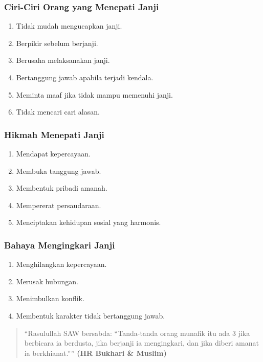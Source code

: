 \subsubsection{Ciri-Ciri Orang yang Menepati Janji}
\begin{enumerate}
\item Tidak mudah mengucapkan janji.
\item Berpikir sebelum berjanji.
\item Berusaha melaksanakan janji.
\item Bertanggung jawab apabila terjadi kendala.
\item Meminta maaf jika tidak mampu memenuhi janji.
\item Tidak mencari cari alasan.
\end{enumerate}

\subsubsection{Hikmah Menepati Janji}
\begin{enumerate}
\item Mendapat kepercayaan.
\item Membuka tanggung jawab.
\item Membentuk pribadi amanah.
\item Mempererat persaudaraan.
\item Menciptakan kehidupan sosial yang harmonis.
\end{enumerate}

\subsubsection{Bahaya Mengingkari Janji}
\begin{enumerate}
\item Menghilangkan kepercayaan.
\item Merusak hubungan.
\item Menimbulkan konflik.
\item Membentuk karakter tidak bertanggung jawab.
\end{enumerate}

\begin{quotation}
  ``Rasulullah SAW bersabda: ``Tanda-tanda orang munafik itu ada 3 jika berbicara ia berdusta, jika berjanji ia mengingkari, dan jika diberi amanat ia berkhianat.'''' \textbf{(HR Bukhari \& Muslim)}
\end{quotation}
